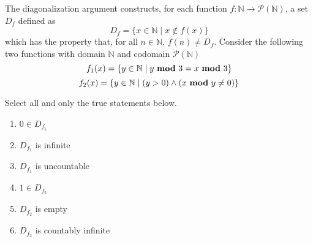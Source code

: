 
The diagonalization argument constructs, 
for each function $f:  \mathbb{N} \to  \mathcal{P}(\mathbb{N})$, a set  $D_f$ defined
as
\[
D_f = \{ x \in \mathbb{N} \mid x \notin  f(x) \}
\]
which has the property  that,  for all  $n \in \mathbb{N}$, $f(n) \neq  D_f$.
Consider the following two functions with  domain $\mathbb{N}$ and codomain $\mathcal{P}(\mathbb{N})$
\[
f_1(x) =  \{  y \in  \mathbb{N} \mid y~\text{\bf mod}~3 = x~\text{\bf mod}~3  \}
\]
\[
f_2(x) =  \{  y \in  \mathbb{N} \mid (y > 0) \land
(x ~\text{\bf mod}~y \neq  0)\}
\]

Select all and only the true statements below.
\begin{enumerate}
    \item $0 \in D_{f_1}$
    \item $D_{f_1}$ is infinite
    \item $D_{f_1}$ is uncountable
    \item $1 \in D_{f_2}$
    \item $D_{f_2}$ is empty
    \item $D_{f_2}$ is countably infinite
\end{enumerate}